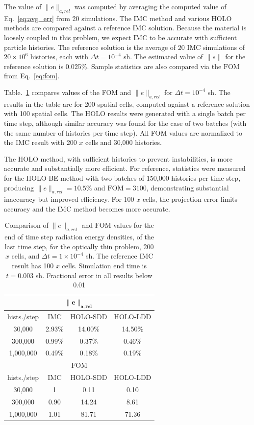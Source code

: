 \documentclass{anstrans}
\newcommand{\FOM}{\ensuremath{\text{FOM}}}
\renewcommand{\ss}{\ensuremath{\|s\|}}
\begin{document}
The value of $\|e\|_{a,rel}$ was computed by averaging the computed value of Eq.~\eqref{eq:avg_err}
from 20 simulations.  The IMC method and various HOLO methods are compared against a reference IMC
solution. Because the material is loosely coupled in this problem, we expect IMC to be accurate with
sufficient particle
histories.  The
reference solution is the average of 20 IMC simulations of $20\times10^6$
histories, each with $\Delta t =10^{-4}$ sh.  The estimated value of $\ss$ for the
reference solution is 0.025\%.  Sample statistics are also compared via the $\FOM$
from Eq.~\eqref{eq:fom}.

Table.~\ref{tab:thin_short} compares values of the FOM and $\|e\|_{a,rel}$ for $\Delta t=10^{-4}$
sh.  The results in the table are for 200 spatial cells, computed against a reference solution with 100 spatial cells.
The HOLO results were generated with a single batch per time step, although similar accuracy was found for the case
of two batches (with the same number of histories per time step).   
 All FOM values are normalized to the IMC result with 
200 $x$ cells and 30,000 histories. 

The HOLO method, with sufficient histories to prevent instabilities, is more accurate and
substantially more efficient.     For reference, statistics were measured for the HOLO-BE method with two batches of 150,000
histories per time step, producing $\|e\|_{a,rel}=10.5\%$ and $\FOM=3100$, demonstrating
substantial inaccuracy but improved efficiency.
 For 100 $x$ cells, the projection error limits accuracy and the
IMC method becomes more accurate.
\begin{table}[H]
\centering
\caption{\label{tab:thin_short} {Comparison of $\|e\|_{a,rel}$ and $\FOM$ values for the end of time
    step radiation energy densities, of the last time step, for the optically
    thin problem, 200 $x$ cells, and $\Delta t = 1\times 10^{-4}$ sh.  The reference IMC result has 100 $x$ cells.
    Simulation end time is ${t=0.003}$ sh. Fractional error in all results  below 0.01}}
\begin{tabular}{|c|ccc|}\cline{1-4}
    \multicolumn{4}{|c|}{$\mathbf{\|e\|_{a,rel}}$} \\ \hline
hists./step   & IMC     & HOLO-SDD  &  HOLO-LDD \\ \hline
   30,000     & 2.93\%   & 14.00\%   & 14.50\%      \\
  300,000     & 0.99\%   & 0.37\%    &  0.46\%      \\ 
  1,000,000   & 0.49\%   & 0.18\%    &  0.19\%       \\ \hline
    \multicolumn{4}{|c|}{\textbf{\FOM}} \\ \hline
hists./step   & IMC    & HOLO-SDD  &  HOLO-LDD \\ \hline
   30,000     & 1      &  0.11  & 0.10 \\
  300,000     & 0.90   &  14.24 & 8.61 \\
  1,000,000   & 1.01   &  81.71 & 71.36 \\\hline
  \end{tabular}
  \end{table}
\end{document}
